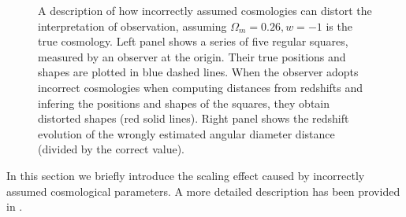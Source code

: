 \documentclass[iop]{emulateapj}
\begin{document}
\begin{figure}
   \caption{\label{fig_xyquan}
   A description of how incorrectly assumed cosmologies can distort the interpretation of observation,
   assuming $\Omega_m=0.26,w=-1$ is the true cosmology. 
   Left panel shows a series of five regular squares, measured by an observer at the origin.
   Their true positions and shapes are plotted in blue dashed lines.
   When the observer adopts incorrect cosmologies when computing distances from redshifts and infering the positions and shapes of the squares,
   they obtain distorted shapes (red solid lines).
   Right panel shows the redshift evolution of the wrongly estimated angular diameter distance (divided by the correct value).
   }
\end{figure}

In this section we briefly introduce the scaling effect caused by incorrectly assumed cosmological parameters.
A more detailed description has been provided in \cite{Li2014,Li2015,Li2016}.
\end{document}
